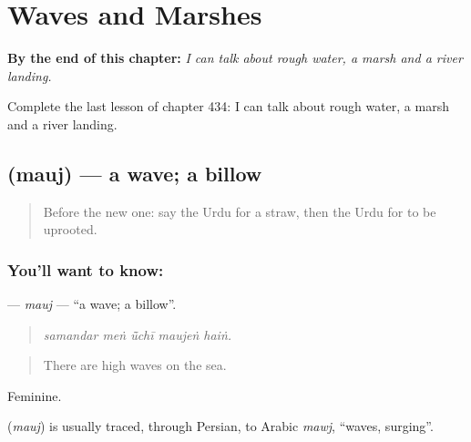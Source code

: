 
\chapter{Waves and Marshes}
\label{ch:ur-waves-and-marshes}

\begin{chapteropening}
\textbf{By the end of this chapter:} \emph{I can talk about rough water, a marsh and a river landing.}

Complete the last lesson of chapter 434: I can talk about rough water, a marsh and a river landing.
\end{chapteropening}

\section[\texorpdfstring{\ur{موج} (mauj)}{موج (mauj)}]{ (mauj) — a wave; a billow}

\label{lesson:UR-C434-mauj}



\begin{quote}
Before the new one: say the Urdu for a straw, then the Urdu for to be uprooted.
\end{quote}

\subsection*{You'll want to know: }
\textbf{} — \emph{mauj} — \textquotedblleft{}a wave; a billow\textquotedblright{}.

\begin{quote}
    
\end{quote}

\begin{quote}
\emph{samandar meṅ ū̃chī maujeṅ haiṅ.}
\end{quote}

\begin{quote}
There are high waves on the sea.
\end{quote}

Feminine.

\begin{cousinweb}
\textbf{} (\emph{mauj}) is usually traced, through Persian, to Arabic \emph{mawj}, \textquotedblleft{}waves, surging\textquotedblright{}.
\end{cousinweb}

